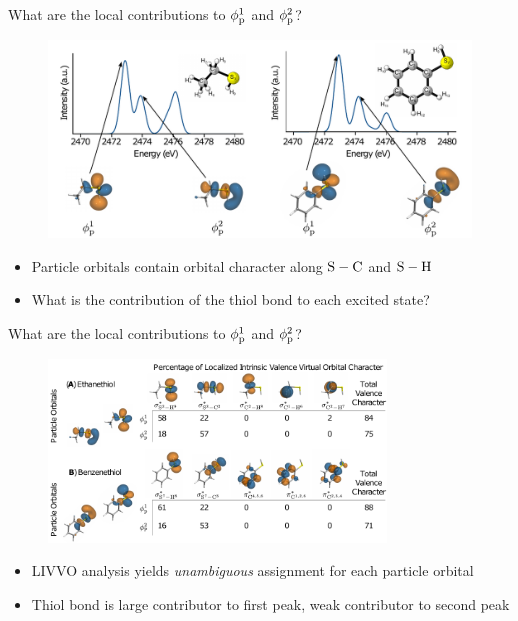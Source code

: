 \documentclass[t]{beamer}
\begin{document}
\begin{frame}{What are the local contributions to $\phi^1_{\rm p}$ and $\phi^2_{\rm p}$?}
\begin{figure}
\includegraphics[width=\textwidth]{ethane_benzenethiol_spectra.pdf}
\end{figure}
\begin{itemize}
\item Particle orbitals contain orbital character along ${\rm S-C}$ and ${\rm S-H}$
\item What is the contribution of the thiol bond to each excited state?
\end{itemize}
\end{frame}

\begin{frame}{What are the local contributions to $\phi^1_{\rm p}$ and $\phi^2_{\rm p}$?}
\begin{figure}
\centering
\includegraphics[width=0.8\textwidth]{alt_ethane_benzenethiol_livvo.pdf}
\end{figure}
\begin{itemize}
\item LIVVO analysis yields \textit{unambiguous} assignment for each particle orbital
\item Thiol bond is large contributor to first peak, weak contributor to second peak
\end{itemize}
\end{frame}
\end{document}
